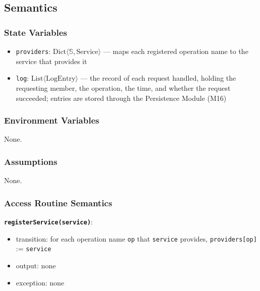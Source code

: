 \documentclass[12pt, titlepage]{article}
\begin{document}
\subsection{Semantics}

\subsubsection{State Variables}
\begin{itemize}
  \item \texttt{providers}: $\text{Dict}\langle \mathbb{S}, \text{Service} \rangle$ --- maps each registered operation name to the service that provides it
  \item \texttt{log}: $\text{List}\langle \text{LogEntry} \rangle$ --- the record of each request handled, holding the requesting member, the operation, the time, and whether the request succeeded; entries are stored through the Persistence Module (M16)
\end{itemize}

\subsubsection{Environment Variables}
None.

\subsubsection{Assumptions}
None.

\subsubsection{Access Routine Semantics}

\textbf{\texttt{registerService(service)}}:
\begin{itemize}
  \item transition: for each operation name \texttt{op} that \texttt{service} provides, \texttt{providers[op]} := \texttt{service}
  \item output: none
  \item exception: none
\end{itemize}
\end{document}

